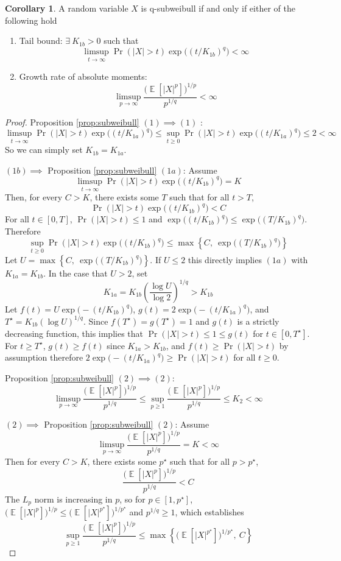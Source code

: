 \documentclass{article}
\theoremstyle{definition}
\newtheorem{corollary}{Corollary}[theorem]
\DeclareMathOperator{\E}{\mathbb{E}}
\begin{document}
\begin{corollary} %
\label{cor:subweibull}
A random variable $X$ is q-subweibull if and only if either of the following hold
\begin{enumerate}
  \item Tail bound: $\exists~K_{1b}>0$ such that %
    \[\limsup_{t\to\infty} \Pr(\vert X\vert > t)\exp\big((t/K_{1b})^q\big)<\infty\]
  \item Growth rate of absolute moments:
    \[\limsup_{p\to\infty} \frac{\big(\E[\vert X\vert^p]\big)^{1/p}}{p^{1/q}}<\infty\]
\end{enumerate}
\end{corollary}
\begin{proof}
Proposition \ref{prop:subweibull} $(1)\implies (1)$ :
\[
\limsup_{t\to\infty} \Pr(\vert X\vert > t)\exp\big((t/K_{1a})^q\big)\leq \sup_{t\geq 0} \Pr(\vert X\vert > t)\exp\big((t/K_{1a})^q\big)\leq 2<\infty
\]
So we can simply set $K_{1b}=K_{1a}$.

$(1b)\implies$ Proposition \ref{prop:subweibull} $(1a)$:
Assume 
\[\limsup_{t\to\infty} \Pr(\vert X\vert > t)\exp\big((t/K_{1b})^q\big)=K\]
Then, for every $C>K$, there exists some $T$ such that for all $t>T$, 
\[\Pr(\vert X\vert > t)\exp\big((t/K_{1b})^q\big)<C\]
For all $t\in[0,T]$, $\Pr(\vert X\vert > t)\leq 1$ and $\exp\big((t/K_{1b})^q\big)\leq \exp\big((T/K_{1b})^q\big)$. Therefore 
\[\sup_{t\geq 0} \Pr(\vert X\vert > t)\exp\big((t/K_{1b})^q\big)\leq \max\left\{C,~\exp\big((T/K_{1b})^q\big)\right\}\]
Let $U = \max\left\{C,~\exp\big((T/K_{1b})^q\big)\right\}$. If $U\leq 2$ this directly implies $(1a)$ with $K_{1a}=K_{1b}$. In the case that $U>2$, set 
\[K_{1a}=K_{1b}\left(\frac{\log U}{\log 2}\right)^{1/q}> K_{1b}\]
Let $f(t)= U\exp\big(-(t/K_{1b})^q\big)$, $g(t)=2\exp\big(-(t/K_{1a})^q\big)$, and $T^\star=K_{1b} (\log U)^{1/q}$. Since $f(T^\star)=g(T^\star)=1$ and $g(t)$ is a strictly decreasing function, this implies that $\Pr(\vert X\vert > t)\leq 1\leq g(t)$ for $t\in[0,T^\star]$. For $t\geq T^\star$, $g(t)\geq f(t)$ since $K_{1a}>K_{1b}$, and $f(t)\geq \Pr(\vert X\vert > t)$ by assumption therefore $2\exp\big(-(t/K_{1a})^q\big)\geq \Pr(\vert X\vert > t)$ for all $t\geq 0$.

Proposition \ref{prop:subweibull} $(2)\implies (2)$: 
\[\limsup_{p\to\infty} \frac{\big(\E[\vert X\vert^p]\big)^{1/p}}{p^{1/q}}\leq \sup_{p\geq 1} \frac{\big(\E[\vert X\vert^p]\big)^{1/p}}{p^{1/q}}\leq K_2 < \infty\]

$(2)\implies$ Proposition \ref{prop:subweibull} $(2)$: 
Assume \[\limsup_{p\to\infty} \frac{\big(\E[\vert X\vert^p]\big)^{1/p}}{p^{1/q}}=K<\infty\]
Then for every $C>K$, there exists some $p^\star$ such that for all $p>p^\star$,
\[\frac{\big(\E[\vert X\vert^p]\big)^{1/p}}{p^{1/q}}<C\]
The $L_p$ norm is increasing in $p$, so for $p\in[1,p^\star]$, $\big(\E[\vert X\vert^p]\big)^{1/p}\leq \big(\E[\vert X\vert^{p^\star}]\big)^{1/p^\star}$ and $p^{1/q}\geq 1$, which establishes
\[\sup_{p\geq 1}\frac{\big(\E[\vert X\vert^p]\big)^{1/p}}{p^{1/q}}\leq \max\left\{\big(\E[\vert X\vert^{p^\star}]\big)^{1/p^\star},~C\right\}\]
\end{proof}
\end{document}
